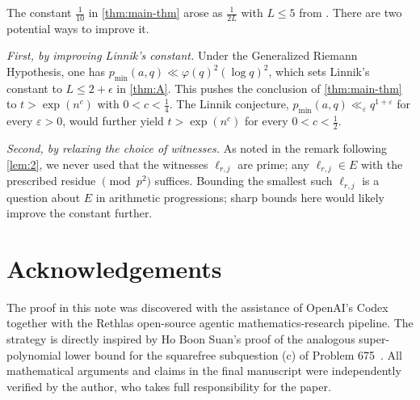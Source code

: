 \documentclass{amsart}
\begin{document}
\begin{remark}\label{rem:end}
The constant $\tfrac{1}{10}$ in \cref{thm:main-thm} arose as $\tfrac{1}{2L}$ with $L \leq 5$ from \cite{xylouris2011}. There are two potential ways to improve it.

\smallskip
\noindent\emph{First, by improving Linnik's constant.} Under the Generalized Riemann Hypothesis, one has $p_{\min}(a, q) \ll \varphi(q)^2 (\log q)^2$, which sets Linnik's constant to $L \leq 2 + \epsilon$ in \cref{thm:A}. This pushes the conclusion of \cref{thm:main-thm} to $t > \exp(n^c)$ with $0 < c < \tfrac{1}{4}$. The Linnik conjecture, $p_{\min}(a, q) \ll_\varepsilon q^{1+\varepsilon}$ for every $\varepsilon > 0$, would further yield $t > \exp(n^c)$ for every $0 < c < \tfrac{1}{2}$.

\smallskip
\noindent\emph{Second, by relaxing the choice of witnesses.} As noted in the remark following \cref{lem:2}, we never used that the witnesses $\ell_{r,j}$ are prime; any $\ell_{r,j} \in E$ with the prescribed residue $\pmod{p^2}$ suffices. Bounding the smallest such $\ell_{r,j}$ is a question about $E$ in arithmetic progressions; sharp bounds here would likely improve the constant further.
\end{remark}

\section*{Acknowledgements}
The proof in this note was discovered with the assistance of OpenAI's
Codex together with the Rethlas open-source agentic
mathematics-research pipeline. The strategy is directly inspired by
Ho Boon Suan's proof of the analogous super-polynomial lower bound for
the squarefree subquestion (c) of \Erdos Problem 675~\cite{hobs2026}.
All mathematical arguments and claims in the final manuscript were
independently verified by the author, who takes full responsibility
for the paper.
\end{document}
